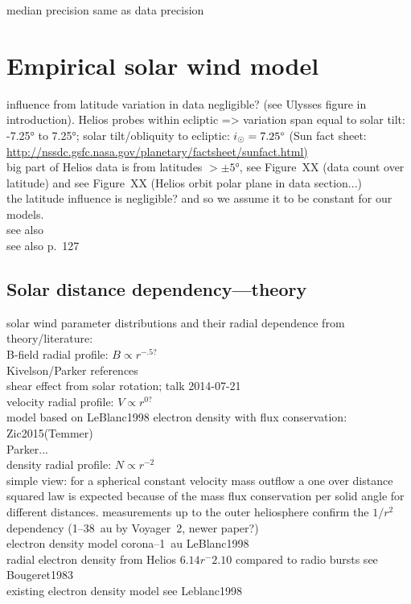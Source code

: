 median precision same as data precision\\


\section{Empirical solar wind model}
influence from latitude variation in data negligible? (see Ulysses figure in introduction). Helios probes within ecliptic => variation span equal to solar tilt: -7.25° to 7.25°; solar tilt/obliquity to ecliptic: $i_\odot = 7.25\degree$ (Sun fact sheet: \url{http://nssdc.gsfc.nasa.gov/planetary/factsheet/sunfact.html)}\\
big part of Helios data is from latitudes $>\pm5$°, see Figure~XX (data count over latitude) and see Figure~XX (Helios orbit polar plane in data section...)\\
the latitude influence is negligible? and so we assume it to be constant for our models.\\
see also \citet{Richardson1995}\\
see also \citet{Schwenn1990} p.~127\\


\subsection{Solar distance dependency---theory}

solar wind parameter distributions and their radial dependence from theory/literature:\\
B-field radial profile: $B \propto r^{-.5?}$\\
	Kivelson/Parker references\\
	shear effect from solar rotation; talk 2014-07-21\\
velocity radial profile: $V \propto r^{0?}$\\
	model based on LeBlanc1998 electron density with flux conservation: Zic2015(Temmer)\\
	Parker...\\
density radial profile: $N \propto r^{-2}$\\
	simple view: for a spherical constant velocity mass outflow a one over distance squared law is expected because of the mass flux conservation per solid angle for different distances. measurements up to the outer heliosphere confirm the $1/r^2$ dependency (1--38~au by Voyager~2, \citep{Belcher1993} newer paper?)\\
	electron density model corona--1~au LeBlanc1998\\
	radial electron density from Helios $6.14r^-2.10$ compared to radio bursts see Bougeret1983\\%
	existing electron density model see Leblanc1998\\

